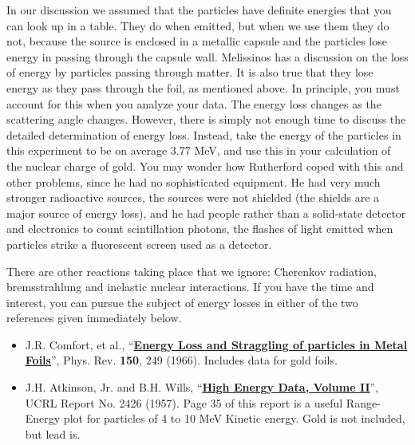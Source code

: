 \documentclass{../lab}
\begin{document}
In our discussion we assumed that the \textalpha{} particles have definite energies that you can look up in a table. They do when emitted, but when we use them they do not, because the source is enclosed in a metallic capsule and the particles lose energy in passing through the capsule wall. Melissinos has a discussion on the loss of energy by \textalpha{} particles passing through matter. It is also true that they lose energy as they pass through the foil, as mentioned above.  In principle, you must account for this when you analyze your data. The energy loss changes as the scattering angle changes. However, there is simply not enough time to discuss the detailed determination of energy loss. Instead, take the energy of the \textalpha{} particles in this experiment to be on average 3.77 MeV, and use this in your calculation of the nuclear charge of gold. You may wonder how Rutherford coped with this and other problems, since he had no sophisticated equipment. He had very much stronger radioactive sources, the sources were not shielded (the shields are a major source of energy loss), and he had people rather than a solid-state detector and electronics to count scintillation photons, the flashes of light emitted when \textalpha{} particles strike a fluorescent screen used as a detector.

There are other reactions taking place that we ignore: Cherenkov radiation, bremsstrahlung and inelastic nuclear interactions. If you have the time and interest, you can pursue the subject of energy losses in either of the two references given immediately below.

\begin{itemize}
    \item J.R. Comfort, et al., ``\href{https://drive.google.com/file/d/1HiGED3QV1r7E5Azw2z5a_h24YGiXcGYJ/view?usp=drive_link}{\textbf{Energy Loss and Straggling of \text\textalpha{} particles in Metal Foils}}'', Phys. Rev. {\textbf {150}}, 249 (1966). Includes data for gold foils.

    \item J.H. Atkinson, Jr. and B.H. Wills, ``\href{https://drive.google.com/file/d/196AL2-3DE3iMRW9_TVSsGX4ZBztANAKO/view?usp=drive_link}{\textbf{High Energy Data, Volume II}}'', UCRL Report No. 2426 (1957). Page 35 of this report is a useful Range-Energy plot for  \textalpha{} particles of 4 to 10 MeV Kinetic energy. Gold is not included, but lead is.
\end{itemize}

\newpage
\end{document}
